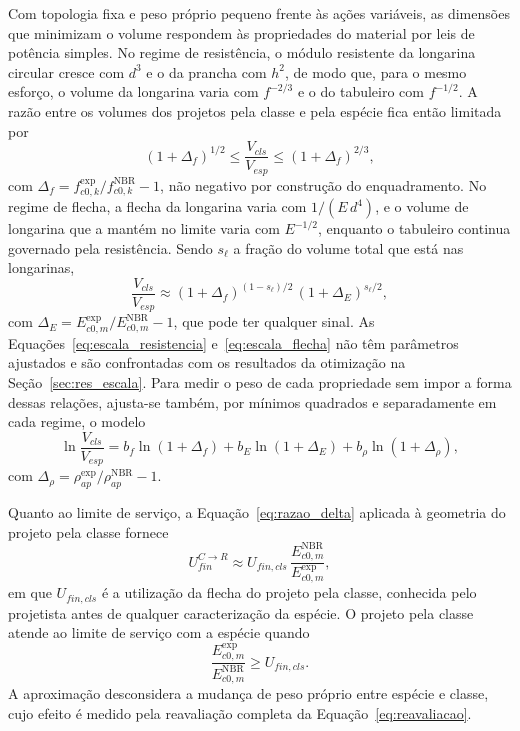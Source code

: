Com topologia fixa e peso próprio pequeno frente às ações variáveis, as dimensões que minimizam o volume respondem às propriedades do material por leis de potência simples. No regime de resistência, o módulo resistente da longarina circular cresce com $d^3$ e o da prancha com $h^2$, de modo que, para o mesmo esforço, o volume da longarina varia com $f^{-2/3}$ e o do tabuleiro com $f^{-1/2}$. A razão entre os volumes dos projetos pela classe e pela espécie fica então limitada por
\begin{equation}
(1+\Delta_f)^{1/2}\leq\frac{V_{cls}}{V_{esp}}\leq(1+\Delta_f)^{2/3},
\label{eq:escala_resistencia}
\end{equation}
com $\Delta_f=f_{c0,k}^{\mathrm{exp}}/f_{c0,k}^{\mathrm{NBR}}-1$, não negativo por construção do enquadramento. No regime de flecha, a flecha da longarina varia com $1/(E\,d^4)$, e o volume de longarina que a mantém no limite varia com $E^{-1/2}$, enquanto o tabuleiro continua governado pela resistência. Sendo $s_\ell$ a fração do volume total que está nas longarinas,
\begin{equation}
\frac{V_{cls}}{V_{esp}}\approx(1+\Delta_f)^{(1-s_\ell)/2}\,(1+\Delta_E)^{s_\ell/2},
\label{eq:escala_flecha}
\end{equation}
com $\Delta_E=E_{c0,m}^{\mathrm{exp}}/E_{c0,m}^{\mathrm{NBR}}-1$, que pode ter qualquer sinal. As Equações~\eqref{eq:escala_resistencia} e~\eqref{eq:escala_flecha} não têm parâmetros ajustados e são confrontadas com os resultados da otimização na Seção~\ref{sec:res_escala}. Para medir o peso de cada propriedade sem impor a forma dessas relações, ajusta-se também, por mínimos quadrados e separadamente em cada regime, o modelo
\begin{equation}
\ln\frac{V_{cls}}{V_{esp}}=b_f\ln(1+\Delta_f)+b_E\ln(1+\Delta_E)+b_\rho\ln(1+\Delta_\rho),
\label{eq:regressao}
\end{equation}
com $\Delta_\rho=\rho_{ap}^{\mathrm{exp}}/\rho_{ap}^{\mathrm{NBR}}-1$.

Quanto ao limite de serviço, a Equação~\eqref{eq:razao_delta} aplicada à geometria do projeto pela classe fornece
\begin{equation}
U_{fin}^{C\rightarrow R}\approx U_{fin,cls}\,\frac{E_{c0,m}^{\mathrm{NBR}}}{E_{c0,m}^{\mathrm{exp}}},
\label{eq:u_ctor}
\end{equation}
em que $U_{fin,cls}$ é a utilização da flecha do projeto pela classe, conhecida pelo projetista antes de qualquer caracterização da espécie. O projeto pela classe atende ao limite de serviço com a espécie quando
\begin{equation}
\frac{E_{c0,m}^{\mathrm{exp}}}{E_{c0,m}^{\mathrm{NBR}}}\geq U_{fin,cls}.
\label{eq:criterio}
\end{equation}
A aproximação desconsidera a mudança de peso próprio entre espécie e classe, cujo efeito é medido pela reavaliação completa da Equação~\eqref{eq:reavaliacao}.


